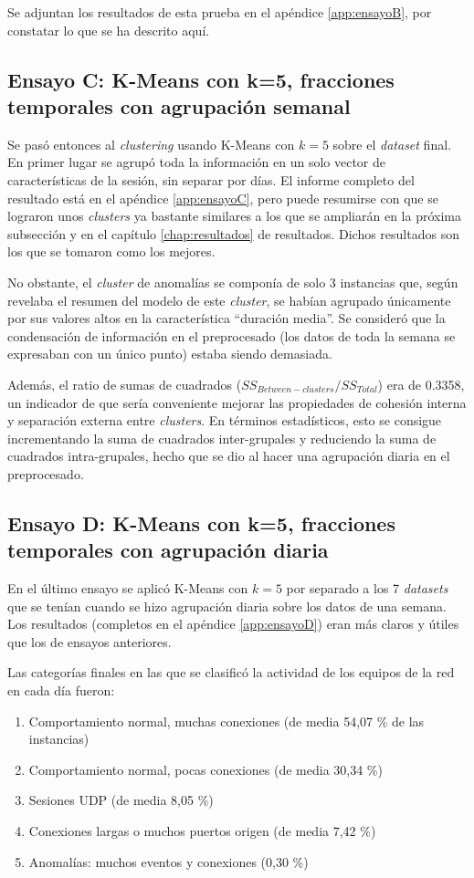 Se adjuntan los resultados de esta prueba en el apéndice \ref{app:ensayoB}, por constatar lo que se ha descrito aquí.

\subsection{Ensayo C: K-Means con k=5, fracciones temporales con agrupación semanal}\label{subsec:ensayoC}

Se pasó entonces al \emph{clustering} usando K-Means con $k=5$ sobre el \emph{dataset} final.
En primer lugar se agrupó toda la información en un solo vector de características de la sesión, sin separar por días.
El informe completo del resultado está en el apéndice \ref{app:ensayoC},
pero puede resumirse con que se lograron unos \emph{clusters} ya bastante similares a los que se ampliarán en la próxima subsección y en el capítulo \ref{chap:resultados} de resultados.
Dichos resultados son los que se tomaron como los mejores.

No obstante, el \emph{cluster} de anomalías se componía de solo 3 instancias que,
según revelaba el resumen del modelo de este \emph{cluster}, se habían agrupado únicamente por sus valores altos en la característica ``duración media''.
Se consideró que la condensación de información en el preprocesado (los datos de toda la semana se expresaban con un único punto) estaba siendo demasiada.

Además, el ratio de sumas de cuadrados ($SS_{Between-clusters} / SS_{Total}$) era de 0.3358,
un indicador de que sería conveniente mejorar las propiedades de cohesión interna y separación externa entre \emph{clusters}.
En términos estadísticos, esto se consigue incrementando la suma de cuadrados inter-grupales y reduciendo la suma de cuadrados intra-grupales,
hecho que se dio al hacer una agrupación diaria en el preprocesado.

\subsection{Ensayo D: K-Means con k=5, fracciones temporales con agrupación diaria}\label{subsec:ensayoD}

En el último ensayo se aplicó K-Means con $k=5$ por separado a los 7 \emph{datasets} que se tenían cuando se hizo agrupación diaria sobre los datos de una semana.
Los resultados (completos en el apéndice \ref{app:ensayoD}) eran más claros y útiles que los de ensayos anteriores.

Las categorías finales en las que se clasificó la actividad de los equipos de la red en cada día fueron:
\begin{enumerate}
    \item Comportamiento normal, muchas conexiones (de media 54,07 \% de las instancias)
    \item Comportamiento normal, pocas conexiones (de media 30,34 \%)
    \item Sesiones UDP (de media 8,05 \%)
    \item Conexiones largas o muchos puertos origen (de media 7,42 \%)
    \item Anomalías: muchos eventos y conexiones (0,30 \%)
\end{enumerate}

